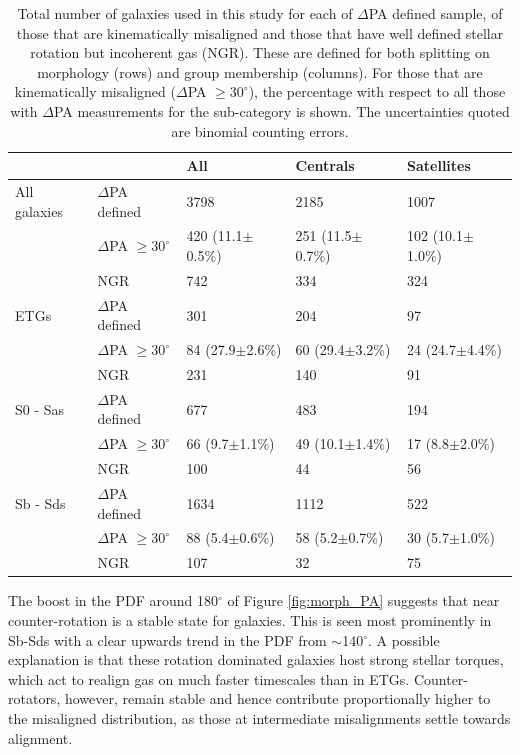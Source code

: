 \documentclass[fleqn,usenatbib]{mnras}
\begin{document}
\begin{table}
\begin{tabular}{lllll}
\hline
        &  & All & Centrals & Satellites \\
\hline
All galaxies & $\Delta$PA defined &  3798 &  2185 &  1007 \\
& $\Delta$PA $\geq 30^{\circ}$ &  420 (11.1$\pm$0.5\%) &  251 (11.5$\pm$0.7\%) &  102 (10.1$\pm$1.0\%) \\
& NGR & 742 &  334 &  324 \\

ETGs & $\Delta$PA defined & 301 & 204 & 97 \\
& $\Delta$PA $\geq 30^{\circ}$ & 84 (27.9$\pm$2.6\%) & 60 (29.4$\pm$3.2\%) & 24 (24.7$\pm$4.4\%)  \\
& NGR & 231 & 140 & 91 \\

S0 - Sas & $\Delta$PA defined & 677 & 483 & 194 \\
& $\Delta$PA $\geq 30^{\circ}$ &  66 (9.7$\pm$1.1\%) & 49 (10.1$\pm$1.4\%) & 17 (8.8$\pm$2.0\%) \\
& NGR & 100 & 44 & 56 \\

Sb - Sds & $\Delta$PA defined & 1634 & 1112 & 522 \\
& $\Delta$PA $\geq 30^{\circ}$ & 88 (5.4$\pm$0.6\%) & 58 (5.2$\pm$0.7\%) & 30 (5.7$\pm$1.0\%) \\
& NGR & 107 & 32 & 75 \\

\end{tabular}
\caption{Total number of galaxies used in this study for each of $\Delta$PA defined sample, of those that are kinematically misaligned and those that have well defined stellar rotation but incoherent gas (NGR). These are defined for both splitting on morphology (rows) and group membership (columns). For those that are kinematically misaligned ($\Delta$PA $\geq 30^{\circ}$), the percentage with respect to all those with $\Delta$PA measurements for the sub-category is shown. The uncertainties quoted are binomial counting errors.}
\label{tab:mega_table}
\end{table}

The boost in the PDF around 180$^{\circ}$ of Figure \ref{fig:morph_PA} suggests that near counter-rotation is a stable state for galaxies. This is seen most prominently in Sb-Sds with a clear upwards trend in the PDF from $\sim$140$^{\circ}$. A possible explanation is that these rotation dominated galaxies host strong stellar torques, which act to realign gas on much faster timescales than in ETGs. Counter-rotators, however, remain stable and hence contribute proportionally higher to the misaligned distribution, as those at intermediate misalignments settle towards alignment. 
\end{document}
